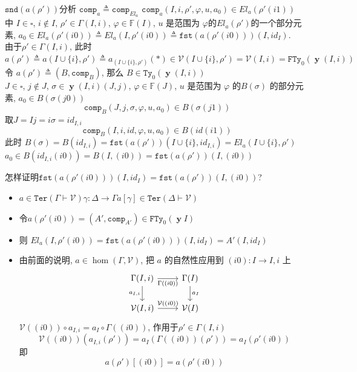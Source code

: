 \documentclass[aspectratio=169,xcolor=dvipsnames]{beamer}
\newcommand\calV{\mathcal{V}}
\newcommand\bbF{\mathbb{F}}
\newcommand\FTy{\mathtt{FTy}}
\newcommand\comp{\mathtt{comp}}
\newcommand\fst{\mathtt{fst}}
\newcommand\snd{\mathtt{snd}}
\newcommand\Ty{\mathtt{Ty}}
\newcommand\Ter{\mathtt{Ter}}
\DeclareMathOperator\y{\mathbf{y}}
\begin{document}
\begin{frame}[shrink]{$\snd(a(\rho'))$分析}
$\comp_{a}\triangleq\comp_{El_{a}}$\qquad
  $\comp_a(I,i,\rho',\varphi,u,a_{0})\in El_{a}(\rho'(i1))$ \\
  中 $I\in\square$, $i\notin I$, $\rho'\in\Gamma(I,i)$, $\varphi\in\bbF(I)$, $u$ 是范围为 $\varphi$的$El_{a}(\rho')$的一个部分元素, $a_0\in El_{a}(\rho'(i0))\triangleq El_{a}(I,\rho'(i0))\triangleq\fst(a(\rho'(i0)))(I,id_I)$.\\
  由于$\rho'\in\Gamma(I,i)$, 此时$a(\rho')\triangleq a(I\cup\{i\},\rho')\triangleq a_{(I\cup\{i\},\rho')}(\ast)\in\calV(I\cup\{i\},\rho')=\calV(I,i)=\FTy_{0}(\y (I,i))$\\
  令 $a(\rho')\triangleq(B,\comp_B)$, 那么 $B\in\Ty_{0}(\y(I,i))$\\
  $J\in\square$, $j\notin J$, $\sigma\in\y(I,i)(J,j)$, $\varphi\in\bbF(J)$, $u$ 是范围为 $\varphi$ 的$B(\sigma)$ 的部分元素, $a_0\in B(\sigma(j0))$\[ \comp_{B}(J,j,\sigma,\varphi,u,a_0) \in B(\sigma(j1)) \]
  取$J=I$\quad $j=i$\quad $\sigma=id_{I,i}$
  \[ \comp_{B}(I,i,id,\varphi,u,a_0) \in B(id(i1)) \]
  此时 $B(\sigma)=B(id_{I,i})=\fst(a(\rho'))(I\cup\{i\}, id_{I,i})=El_a(I\cup\{i\},\rho')$\\
  $a_0\in B(id_{I,i}(i0))=B(I,(i0))=\fst(a(\rho'))(I,(i0))$
\end{frame}

\begin{frame}{怎样证明$\fst(a(\rho'(i0)))(I,id_I) = \fst(a(\rho'))(I,(i0))$?}
  \begin{itemize}
    \item $a\in\Ter(\Gamma\vdash\calV)$\quad$\gamma:\Delta\to\Gamma$\quad$a[\gamma]\in\Ter(\Delta\vdash\calV)$
    \item 令$a(\rho'(i0))=(A',\comp_{A'})\in\FTy_{0}(\y I)$
    \item 则 $El_a(I,\rho'(i0))=\fst(a(\rho'(i0)))(I,id_I)=A'(I,id_{I})$
    \item 由前面的说明, $a\in\hom(\Gamma,\calV)$, 把 $a$ 的自然性应用到 $(i0):I\to I,i$ 上
    \[
    \begin{tikzcd}
      \Gamma(I,i)\arrow[d,"{a_{I,i}}"']\arrow[r,"{\Gamma((i0))}"'] & \Gamma(I) \arrow[d,"{a_I}"] \\
      \calV(I,i) \arrow[r,"{\calV((i0))}"] & \calV(I)
    \end{tikzcd}
    \]
    $\calV((i0))\circ a_{I,i} = a_I\circ\Gamma((i0))$, 作用于$\rho'\in\Gamma(I,i)$
    \[ \calV((i0))(a_{I,i}(\rho')) = a_I(\Gamma((i0))(\rho')) = a_I(\rho'(i0)) \]
    即\[ a(\rho')[(i0)] = a(\rho'(i0)) \]
  \end{itemize}
\end{frame}
\end{document}
